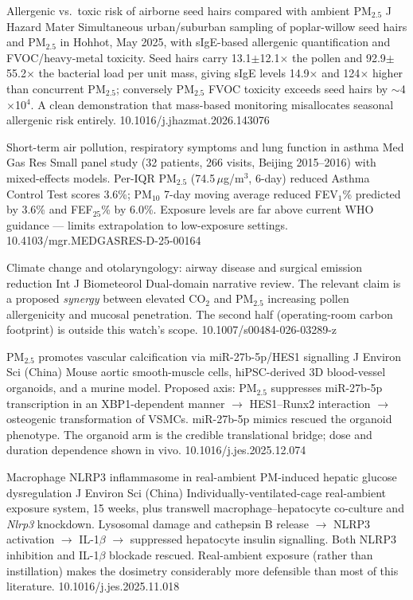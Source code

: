 \documentclass[10pt]{article}
\begin{document}
{Allergenic vs.\ toxic risk of airborne seed hairs compared with ambient PM$_{2.5}$}
{J Hazard Mater}
{Simultaneous urban/suburban sampling of poplar-willow seed hairs and PM$_{2.5}$ in
Hohhot, May 2025, with sIgE-based allergenic quantification and FVOC/heavy-metal
toxicity. Seed hairs carry 13.1$\pm$12.1$\times$ the pollen and 92.9$\pm$55.2$\times$ the
bacterial load per unit mass, giving sIgE levels 14.9$\times$ and 124$\times$ higher than
concurrent PM$_{2.5}$; conversely PM$_{2.5}$ FVOC toxicity exceeds seed hairs by
$\sim$4$\times$10$^4$. A clean demonstration that mass-based monitoring misallocates
seasonal allergenic risk entirely.}
{10.1016/j.jhazmat.2026.143076}

{Short-term air pollution, respiratory symptoms and lung function in asthma}
{Med Gas Res}
{Small panel study (32 patients, 266 visits, Beijing 2015--2016) with mixed-effects
models. Per-IQR PM$_{2.5}$ (74.5\,$\mu$g/m$^3$, 6-day) reduced Asthma Control Test
scores 3.6\%; PM$_{10}$ 7-day moving average reduced FEV$_1$\% predicted by 3.6\% and
FEF$_{25}$\% by 6.0\%. Exposure levels are far above current WHO guidance --- limits
extrapolation to low-exposure settings.}
{10.4103/mgr.MEDGASRES-D-25-00164}

{Climate change and otolaryngology: airway disease and surgical emission reduction}
{Int J Biometeorol}
{Dual-domain narrative review. The relevant claim is a proposed \emph{synergy} between
elevated CO$_2$ and PM$_{2.5}$ increasing pollen allergenicity and mucosal penetration.
The second half (operating-room carbon footprint) is outside this watch's scope.}
{10.1007/s00484-026-03289-z}


{PM$_{2.5}$ promotes vascular calcification via miR-27b-5p/HES1 signalling}
{J Environ Sci (China)}
{Mouse aortic smooth-muscle cells, hiPSC-derived 3D blood-vessel organoids, and a murine
model. Proposed axis: PM$_{2.5}$ suppresses miR-27b-5p transcription in an XBP1-dependent
manner $\to$ HES1--Runx2 interaction $\to$ osteogenic transformation of VSMCs.
miR-27b-5p mimics rescued the organoid phenotype. The organoid arm is the credible
translational bridge; dose and duration dependence shown in vivo.}
{10.1016/j.jes.2025.12.074}

{Macrophage NLRP3 inflammasome in real-ambient PM-induced hepatic glucose dysregulation}
{J Environ Sci (China)}
{Individually-ventilated-cage real-ambient exposure system, 15 weeks, plus transwell
macrophage--hepatocyte co-culture and \textit{Nlrp3} knockdown. Lysosomal damage and
cathepsin B release $\to$ NLRP3 activation $\to$ IL-1$\beta$ $\to$ suppressed hepatocyte
insulin signalling. Both NLRP3 inhibition and IL-1$\beta$ blockade rescued.
Real-ambient exposure (rather than instillation) makes the dosimetry considerably more
defensible than most of this literature.}
{10.1016/j.jes.2025.11.018}
\end{document}
